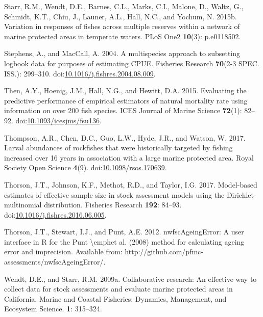 \documentclass[11pt,
  english,
  letterpaper,
]{article}
\newlength{\cslhangindent}
\newenvironment{CSLReferences}[2] %
 {%
  \setlength{\parindent}{0pt}
  \ifodd #1 \everypar{\setlength{\hangindent}{\cslhangindent}}\ignorespaces\fi
  \ifnum #2 > 0
  \setlength{\parskip}{#2\baselineskip}
  \fi
 }%
 {}
\begin{document}
\begin{CSLReferences}{1}{0}
\leavevmode{}%
Starr, R.M., Wendt, D.E., Barnes, C.L., Marks, C.I., Malone, D., Waltz, G., Schmidt, K.T., Chiu, J., Launer, A.L., Hall, N.C., and Yochum, N. 2015b. Variation in responses of fishes across multiple reserves within a network of marine protected areas in temperate waters. PLoS One2 \textbf{10}(3): p.e0118502.

\leavevmode{}%
Stephens, A., and MacCall, A. 2004. A multispecies approach to subsetting logbook data for purposes of estimating {CPUE}. Fisheries Research \textbf{70}(2-3 SPEC. ISS.): 299--310. doi:\href{https://doi.org/10.1016/j.fishres.2004.08.009}{10.1016/j.fishres.2004.08.009}.

\leavevmode{}%
Then, A.Y., Hoenig, J.M., Hall, N.G., and Hewitt, D.A. 2015. Evaluating the predictive performance of empirical estimators of natural mortality rate using information on over 200 fish species. ICES Journal of Marine Science \textbf{72}(1): 82--92. doi:\href{https://doi.org/10.1093/icesjms/fsu136}{10.1093/icesjms/fsu136}.

\leavevmode{}%
Thompson, A.R., Chen, D.C., Guo, L.W., Hyde, J.R., and Watson, W. 2017. Larval abundances of rockfishes that were historically targeted by fishing increased over 16 years in association with a large marine protected area. Royal Society Open Science \textbf{4}(9). doi:\href{https://doi.org/10.1098/rsos.170639}{10.1098/rsos.170639}.

\leavevmode{}%
Thorson, J.T., Johnson, K.F., Methot, R.D., and Taylor, I.G. 2017. Model-based estimates of effective sample size in stock assessment models using the {Dirichlet}-multinomial distribution. Fisheries Research \textbf{192}: 84--93. doi:\href{https://doi.org/10.1016/j.fishres.2016.06.005}{10.1016/j.fishres.2016.06.005}.

\leavevmode{}%
Thorson, J.T., Stewart, I.J., and Punt, A.E. 2012. {nwfscAgeingError}: A user interface in {R} for the {Punt} {\textbackslash{}}emphet al. (2008) method for calculating ageing error and imprecision. Available from: http://github.com/pfmc-assessments/nwfscAgeingError/.

\leavevmode{}%
Wendt, D.E., and Starr, R.M. 2009a. Collaborative research: An effective way to collect data for stock assessments and evaluate marine protected areas in {C}alifornia. Marine and Coastal Fisheries: Dynamics, Management, and Ecosystem Science. \textbf{1}: 315--324.


\end{CSLReferences}
\end{document}

